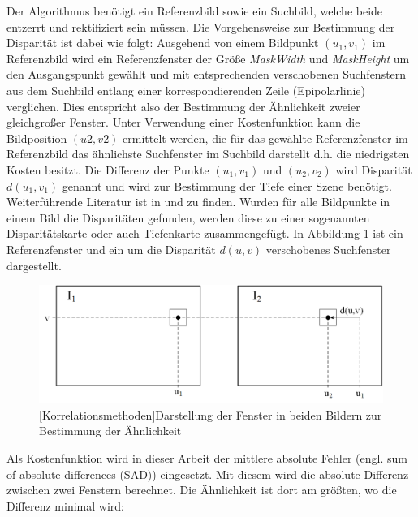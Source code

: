 \documentclass[times, 10pt,twocolumn]{article}
\begin{document}

Der Algorithmus benötigt ein Referenzbild sowie ein Suchbild, welche beide entzerrt und rektifiziert sein müssen. Die Vorgehensweise zur Bestimmung der Disparität ist dabei wie folgt: Ausgehend von einem Bildpunkt $(u_1,v_1)$ im Referenzbild wird ein Referenzfenster der Größe \textit{MaskWidth} und \textit{MaskHeight} um den Ausgangspunkt gewählt und mit entsprechenden verschobenen Suchfenstern aus dem Suchbild entlang einer korrespondierenden Zeile (Epipolarlinie) verglichen. Dies entspricht also der Bestimmung der Ähnlichkeit zweier gleichgroßer Fenster. Unter Verwendung einer Kostenfunktion kann die Bildposition $(u2, v2)$ ermittelt werden, die für das gewählte Referenzfenster im Referenzbild das ähnlichste Suchfenster im Suchbild darstellt d.h. die niedrigsten Kosten besitzt. Die Differenz der Punkte $(u_1,v_1)$ und $(u_2,v_2)$ wird Disparität $d(u_1,v_1)$ genannt und wird zur Bestimmung der Tiefe einer Szene benötigt. Weiterführende Literatur ist in \cite{Hartley.2003} und \cite{Schreer.2005} zu finden. Wurden für alle Bildpunkte in einem Bild die Disparitäten gefunden, werden diese zu einer sogenannten Disparitätskarte oder auch Tiefenkarte zusammengefügt. In Abbildung \ref{fig:korrelationsmethoden} ist ein Referenzfenster und ein um die Disparität $d(u,v)$ verschobenes Suchfenster dargestellt.

\begin{figure}[!ht]
	\centering
	\includegraphics[width=0.9\linewidth]{image/korrelationsverfahren.png}
	[Korrelationsmethoden]{Darstellung der Fenster in beiden Bildern zur Bestimmung der Ähnlichkeit}
	\label{fig:korrelationsmethoden}
\end{figure}


Als Kostenfunktion wird in dieser Arbeit der mittlere absolute Fehler (engl. sum of absolute differences (SAD)) eingesetzt. Mit diesem wird die absolute Differenz zwischen zwei Fenstern berechnet. Die Ähnlichkeit ist dort am größten, wo die Differenz minimal wird:
\end{document}
